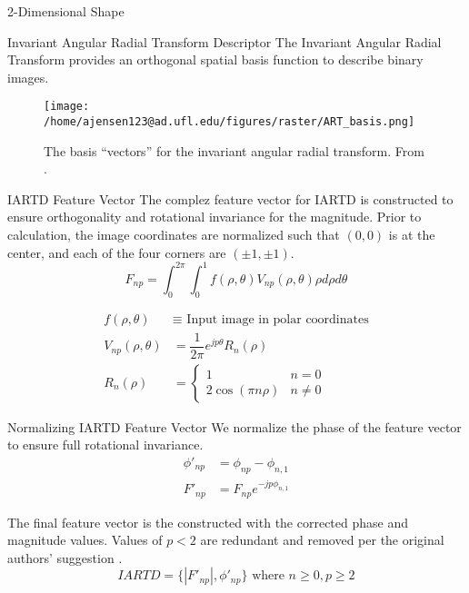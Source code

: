 \documentclass[presentation, aspectratio=1610]{beamer}
\begin{document}
\begin{frame}[label={sec:orgfc4d6e1}]{2-Dimensional Shape}
\end{frame}
\begin{frame}[label={sec:org448a40a}]{Invariant Angular Radial Transform Descriptor}
The Invariant Angular Radial Transform provides an orthogonal spatial basis function to describe binary images.

\begin{figure}[htbp]
\centering
\texttt{[image: /home/ajensen123@ad.ufl.edu/figures/raster/ART\_basis.png]}
\caption{The basis ``vectors'' for the invariant angular radial transform. From \autocite{leeNewShapeDescription2012}.}
\end{figure}
\end{frame}
\begin{frame}[label={sec:org394182f}]{IARTD Feature Vector}
The complez feature vector for IARTD is constructed to ensure orthogonality and rotational invariance for the magnitude. Prior to calculation, the image coordinates are normalized such that \((0,0)\) is at the center, and each of the four corners are \((\pm 1, \pm 1)\).
\begin{equation}
  F_{np} = \int_{0}^{2\pi}\int_{0}^{1} f(\rho,\theta)V_{np}(\rho,\theta)\rho d\rho d\theta
\end{equation}


\begin{equation}
	\begin{split}
		f(\rho,\theta) & \equiv \text{ Input image in polar coordinates}  \\
		V_{np}(\rho,\theta)         & = \dfrac{1}{2\pi}e^{jp\theta}R_{n}(\rho)      \\
		R_{n}(\rho)    & =
		\begin{cases}
			1                   & n=0     \\
			2 \cos (\pi n \rho) & n \ne 0
		\end{cases}
	\end{split}
\end{equation}
\end{frame}
\begin{frame}[label={sec:org178002f}]{Normalizing IARTD Feature Vector}
We normalize the phase of the feature vector to ensure full rotational invariance.
\begin{equation}
  \begin{split}
    \phi'_{np} &= \phi_{np}-\phi_{n,1} \\
    F'_{np} &= F_{np}e^{-jp\phi_{n,1}}
  \end{split}
\end{equation}

The final feature vector is the constructed with the corrected phase and magnitude values. Values of \(p<2\) are redundant and removed per the original authors' suggestion \autocite{leeNewShapeDescription2012}.
\begin{equation}
  IARTD = \{|F'_{np}|,\phi'_{np}\} \text{ where } n\ge0,p\ge2
\end{equation}
\end{frame}
\end{document}

